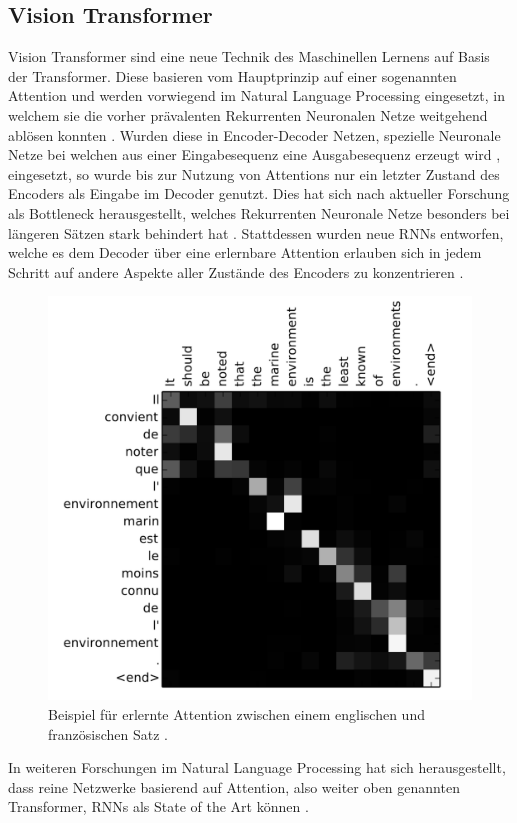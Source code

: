 \documentclass[twoside,a4paper]{IEEEtran}
\begin{document}
\subsection{Vision Transformer} %

Vision Transformer sind eine neue Technik des Maschinellen Lernens auf Basis der Transformer. Diese basieren vom Hauptprinzip auf einer sogenannten Attention und werden vorwiegend im Natural Language Processing eingesetzt, in welchem sie die vorher prävalenten Rekurrenten Neuronalen Netze weitgehend ablösen konnten \cite{TRANSFORMERS}. Wurden diese in Encoder-Decoder Netzen, spezielle Neuronale Netze bei welchen aus einer Eingabesequenz eine Ausgabesequenz erzeugt wird \cite[S.388-389]{MACHINE_LEARNING}, eingesetzt, so wurde bis zur Nutzung von Attentions nur ein letzter Zustand des Encoders als Eingabe im Decoder genutzt. Dies hat sich nach aktueller Forschung als Bottleneck herausgestellt, welches Rekurrenten Neuronale Netze besonders bei längeren Sätzen stark behindert hat \cite[S.2]{TRANSFORMERS}. Stattdessen wurden neue RNNs entworfen, welche es dem Decoder über eine erlernbare Attention erlauben sich in jedem Schritt auf andere Aspekte aller Zustände des Encoders zu konzentrieren \cite[S.4]{RNN_ATTENTION}.  

\begin{figure}[!htb]
	\includegraphics[width=\columnwidth]{attention_visualized}
	\caption{Beispiel für erlernte Attention zwischen einem englischen und französischen Satz \cite[S.6]{RNN_ATTENTION}.}
	\label{bild1}
\end{figure}
In weiteren Forschungen im Natural Language Processing hat sich herausgestellt, dass reine Netzwerke basierend auf Attention, also weiter oben genannten Transformer, RNNs als State of the Art können \cite[S.2]{TRANSFORMERS}. 
\end{document}
